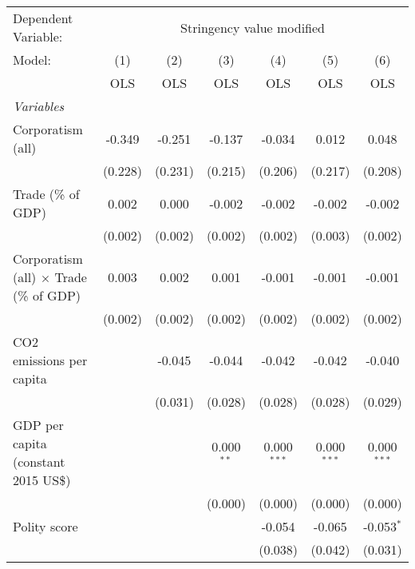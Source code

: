 
\begingroup
\centering
\begin{tabular}{lcccccc}
   \toprule
   Dependent Variable: & \multicolumn{6}{c}{Stringency value modified}\\
   Model:                                         & (1)     & (2)     & (3)          & (4)           & (5)           & (6)\\  
                                                  &  OLS    & OLS     & OLS          & OLS           & OLS           & OLS\\  
   \midrule
   \emph{Variables}\\
   Corporatism (all)                              & -0.349  & -0.251  & -0.137       & -0.034        & 0.012         & 0.048\\   
                                                  & (0.228) & (0.231) & (0.215)      & (0.206)       & (0.217)       & (0.208)\\   
   Trade (\% of GDP)                              & 0.002   & 0.000   & -0.002       & -0.002        & -0.002        & -0.002\\   
                                                  & (0.002) & (0.002) & (0.002)      & (0.002)       & (0.003)       & (0.002)\\   
   Corporatism (all) $\times$ Trade (\% of GDP)   & 0.003   & 0.002   & 0.001        & -0.001        & -0.001        & -0.001\\   
                                                  & (0.002) & (0.002) & (0.002)      & (0.002)       & (0.002)       & (0.002)\\   
   CO2 emissions per capita                       &         & -0.045  & -0.044       & -0.042        & -0.042        & -0.040\\   
                                                  &         & (0.031) & (0.028)      & (0.028)       & (0.028)       & (0.029)\\   
   GDP per capita (constant 2015 US\$)            &         &         & 0.000$^{**}$ & 0.000$^{***}$ & 0.000$^{***}$ & 0.000$^{***}$\\   
                                                  &         &         & (0.000)      & (0.000)       & (0.000)       & (0.000)\\   
   Polity score                                   &         &         &              & -0.054        & -0.065        & -0.053$^{*}$\\   
                                                  &         &         &              & (0.038)       & (0.042)       & (0.031)\\   

\end{tabular}
